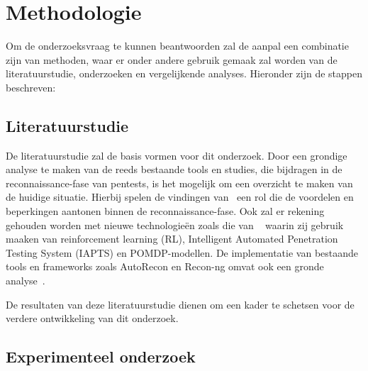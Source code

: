 


\section{Methodologie}
\label{sec:methodologie}

Om de onderzoeksvraag te kunnen beantwoorden zal de aanpal een combinatie zijn van methoden, waar er onder andere gebruik
gemaak zal worden van de literatuurstudie, onderzoeken en vergelijkende analyses. Hieronder zijn de stappen beschreven:

\subsection{Literatuurstudie}

De literatuurstudie zal de basis vormen voor dit onderzoek. Door een grondige analyse te maken van de reeds bestaande tools en studies,
die bijdragen in de reconnaissance-fase van pentests, is het mogelijk om een overzicht te maken van de huidige situatie.
Hierbij spelen de vindingen van~\textcite{Shah,Kothia} een rol die de voordelen en beperkingen aantonen binnen de reconnaissance-fase.
Ook zal er rekening gehouden worden met nieuwe technologieën zoals die van ~\textcite{Ghanem,Hoang} waarin zij gebruik maaken van
reinforcement learning (RL), Intelligent Automated Penetration Testing System (IAPTS) en POMDP-modellen. De implementatie van bestaande
tools en frameworks zoals AutoRecon en Recon-ng omvat ook een gronde analyse~\autocite{Shebli}.

De resultaten van deze literatuurstudie dienen om een kader te schetsen voor de verdere ontwikkeling van dit onderzoek.

\subsection{Experimenteel onderzoek}

